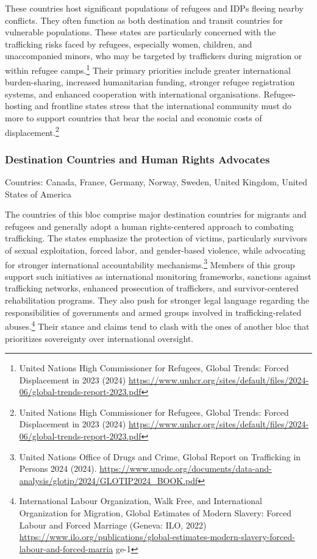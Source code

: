 These countries host significant populations of refugees and IDPs fleeing nearby conflicts. They often function as both destination and transit countries for vulnerable populations. These states are particularly concerned with the trafficking risks faced by refugees, especially women, children, and unaccompanied minors, who may be targeted by traffickers during migration or within refugee camps.\footnote{United Nations High Commissioner for Refugees, Global Trends: Forced Displacement in 2023 (2024) \url{https://www.unhcr.org/sites/default/files/2024-06/global-trends-report-2023.pdf}} Their primary priorities include greater international burden-sharing, increased humanitarian funding, stronger refugee registration systems, and enhanced cooperation with international organisations. Refugee-hosting and frontline states stress that the international community must do more to support countries that bear the social and economic costs of displacement.\footnote{United Nations High Commissioner for Refugees, Global Trends: Forced Displacement in 2023 (2024) \url{https://www.unhcr.org/sites/default/files/2024-06/global-trends-report-2023.pdf}}

\subsubsection{Destination Countries and Human Rights Advocates}

Countries: Canada, France, Germany, Norway, Sweden, United Kingdom, United States of America

The countries of this bloc comprise major destination countries for migrants and refugees and generally adopt a human rights-centered approach to combating trafficking. The states emphasize the protection of victims, particularly survivors of sexual exploitation, forced labor, and gender-based violence, while advocating for stronger international accountability mechanisms.\footnote{United Nations Office of Drugs and Crime, Global Report on Trafficking in Persons 2024 (2024). \url{https://www.unodc.org/documents/data-and-analysis/glotip/2024/GLOTIP2024_BOOK.pdf}} Members of this group support such initiatives as international monitoring frameworks, sanctions against trafficking networks, enhanced prosecution of traffickers, and survivor-centered rehabilitation programs. They also push for stronger legal language regarding the responsibilities of governments and armed groups involved in trafficking-related abuses.\footnote{International Labour Organization, Walk Free, and International Organization for Migration, Global Estimates of Modern Slavery: Forced Labour and Forced Marriage (Geneva: ILO, 2022) \url{https://www.ilo.org/publications/global-estimates-modern-slavery-forced-labour-and-forced-marria} ge-1} Their stance and claims tend to clash with the ones of another bloc that prioritizes sovereignty over international oversight.

